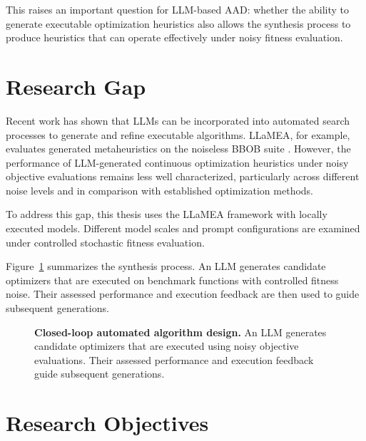 This raises an important question for LLM-based AAD: whether the ability to
generate executable optimization heuristics also allows the synthesis process to
produce heuristics that can operate effectively under noisy fitness evaluation.

\section{Research Gap}
\label{sec:intro_gap}


Recent work has shown that LLMs can be incorporated into automated
search processes to generate and refine executable algorithms.
LLaMEA, for example, evaluates generated metaheuristics on the
noiseless BBOB suite \cite{LLaMEA2024}. However, the performance
of LLM-generated continuous optimization heuristics under noisy
objective evaluations remains less well characterized,
particularly across different noise levels and in comparison
with established optimization methods.

To address this gap, this thesis uses the LLaMEA framework with
locally executed models. Different model scales and prompt
configurations are examined under controlled stochastic fitness
evaluation.

Figure~\ref{fig:intro_paradigm} summarizes the synthesis process. An LLM
generates candidate optimizers that are executed on benchmark functions with
controlled fitness noise. Their assessed performance and execution feedback are
then used to guide subsequent generations.

\begin{figure}[htbp]
    \centering
    
    \caption[Closed-loop automated algorithm design]{
        \textbf{Closed-loop automated algorithm design.}
        An LLM generates candidate optimizers that are executed using noisy
        objective evaluations. Their assessed performance and execution
        feedback guide subsequent generations.
    }
    \label{fig:intro_paradigm}
\end{figure}

\section{Research Objectives}
\label{sec:intro_objectives}

